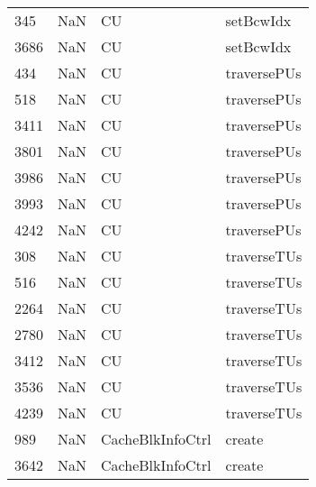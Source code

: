 \begin{tabular}{llll}
345  &                   NaN &                         CU &                                 setBcwIdx \\
3686 &                   NaN &                         CU &                                 setBcwIdx \\
434  &                   NaN &                         CU &                               traversePUs \\
518  &                   NaN &                         CU &                               traversePUs \\
3411 &                   NaN &                         CU &                               traversePUs \\
3801 &                   NaN &                         CU &                               traversePUs \\
3986 &                   NaN &                         CU &                               traversePUs \\
3993 &                   NaN &                         CU &                               traversePUs \\
4242 &                   NaN &                         CU &                               traversePUs \\
308  &                   NaN &                         CU &                               traverseTUs \\
516  &                   NaN &                         CU &                               traverseTUs \\
2264 &                   NaN &                         CU &                               traverseTUs \\
2780 &                   NaN &                         CU &                               traverseTUs \\
3412 &                   NaN &                         CU &                               traverseTUs \\
3536 &                   NaN &                         CU &                               traverseTUs \\
4239 &                   NaN &                         CU &                               traverseTUs \\
989  &                   NaN &           CacheBlkInfoCtrl &                                    create \\
3642 &                   NaN &           CacheBlkInfoCtrl &                                    create \\

\end{tabular}
